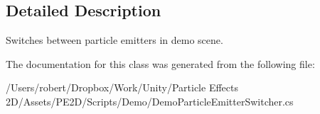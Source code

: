 \subsection{Detailed Description}
Switches between particle emitters in demo scene. 



The documentation for this class was generated from the following file\+:\begin{DoxyCompactItemize}
\item 
/\+Users/robert/\+Dropbox/\+Work/\+Unity/\+Particle Effects 2\+D/\+Assets/\+P\+E2\+D/\+Scripts/\+Demo/Demo\+Particle\+Emitter\+Switcher.\+cs\end{DoxyCompactItemize}

